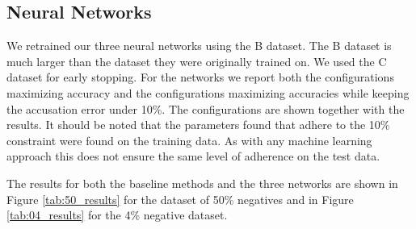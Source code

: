 \subsection{Neural Networks}

We retrained our three neural networks using the \gls{B} dataset. The \gls{B}
dataset is much larger than the dataset they were originally trained on. We used
the \gls{C} dataset for early stopping. For the networks we report both the
configurations maximizing accuracy and the configurations maximizing accuracies
while keeping the accusation error under 10\%. The configurations are shown
together with the results. It should be noted that the parameters found that
adhere to the 10\% constraint were found on the training data. As with any
machine learning approach this does not ensure the same level of adherence on
the test data.

The results for both the baseline methods and the three networks are shown in
Figure \ref{tab:50_results} for the dataset of 50\% negatives and in Figure
\ref{tab:04_results} for the 4\% negative dataset. 


